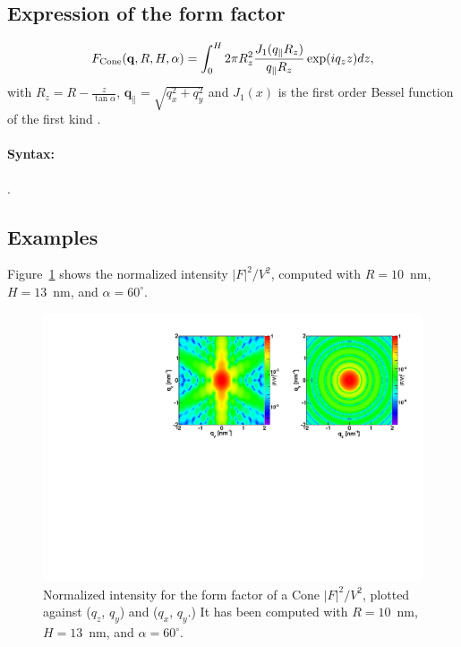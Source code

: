 \subsection{Expression of the form factor}
\begin{equation*}
F_{\rm{Cone}}(\mathbf{q}, R, H, \alpha) = \int_0 ^H 2\pi R_z^2
\frac{J_1(q_{\parallel}R_z)}{q_{\parallel} R_z}\exp(iq_z z)dz,
\end{equation*}
with $R_z =R-\frac{z}{\tan \alpha}$, $\mathbf{q}_{\parallel}=\sqrt{q_x^2+ q_y^2}$ and $J_1(x)$ is the first order
Bessel function of the first kind \cite{AbSt64}.

\paragraph{Syntax:}  . 

\subsection{Examples}
Figure~\ref{fig:FFConeEx} shows the normalized intensity
$|F|^2/V^2$, computed with $R=10$~nm, $H=13$~nm, and $\alpha=60^{\circ}$.
\begin{figure}[h]
\begin{center}
\includegraphics[width=\textwidth]{Figures/figffcone}
\end{center}
\caption{Normalized intensity for the form factor of a Cone
  $|F|^2/V^2$, plotted against ($q_z$, $q_y$) and ($q_x$, $q_y$.) It
  has been  computed with $R=10$~nm, $H=13$~nm,
  and $\alpha=60^{\circ}$.}
\label{fig:FFConeEx}
\end{figure}


